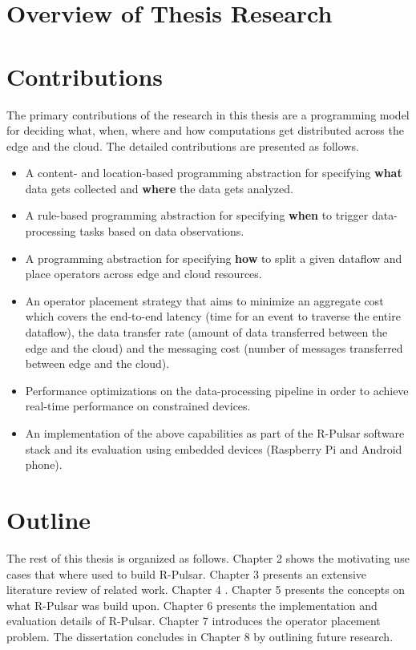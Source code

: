 \section{Overview of Thesis Research}

\section{Contributions}
The primary contributions of the research in this thesis are a programming model for deciding what, when, where and how computations get distributed across the edge and the cloud. The detailed contributions are presented as follows.
\begin{itemize}
  \item A content- and location-based programming abstraction for specifying \textbf{what} data gets collected and \textbf{where} the data gets analyzed.
  \item A rule-based programming abstraction for specifying \textbf{when} to trigger data-processing tasks based on data observations.
  \item A programming abstraction for specifying \textbf{how} to split a given dataflow and place operators across edge and cloud resources.
  \item An operator placement strategy that aims to minimize an aggregate cost which covers the end-to-end latency (time for an event to traverse the entire dataflow), the data transfer rate (amount of data transferred between the edge and the cloud) and the messaging cost (number of messages transferred between edge and the cloud).
  \item Performance optimizations on the data-processing pipeline in order to achieve real-time performance on constrained devices.
  \item An implementation of the above capabilities as part of the R-Pulsar software stack and its evaluation using embedded devices (Raspberry Pi and Android phone).
\end{itemize}

\section{Outline}
The rest of this thesis is organized as follows. Chapter 2 shows the motivating use cases that where used to build R-Pulsar. Chapter 3 presents an extensive literature review of related work. Chapter 4 . Chapter 5 presents the concepts on what R-Pulsar was build upon. Chapter 6 presents the implementation and evaluation details of R-Pulsar. Chapter 7 introduces the operator placement problem. The dissertation concludes in Chapter 8 by outlining future research.